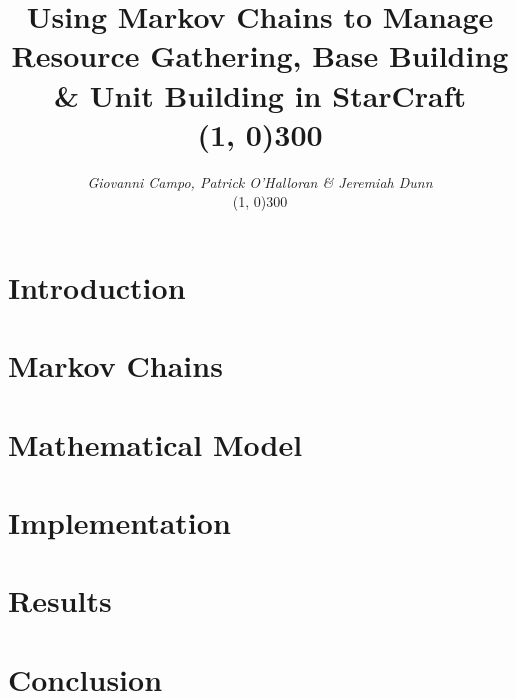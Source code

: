 \documentclass[12pt]{article}
\title{Using Markov Chains to Manage Resource Gathering, Base Building \& Unit Building in StarCraft\hspace{4cm}\\
\line(1, 0){300}
}
\author
{\textit{Giovanni Campo, Patrick O'Halloran \& Jeremiah Dunn}\vspace{0.3cm}\\\vspace{0.2cm}\line(1, 0){300}}
\date{}
\newenvironment{sciabstract}{%
\begin{quote} \bf}
{\end{quote}}
\begin{document}
 

\baselineskip24pt


\maketitle 




\begin{sciabstract}
 	
\end{sciabstract}


\section{Introduction}




\section{Markov Chains}



\section{Mathematical Model}



\section{Implementation}




\section{Results}




\section{Conclusion}





\newpage


\label{endpage}
\end{document}
